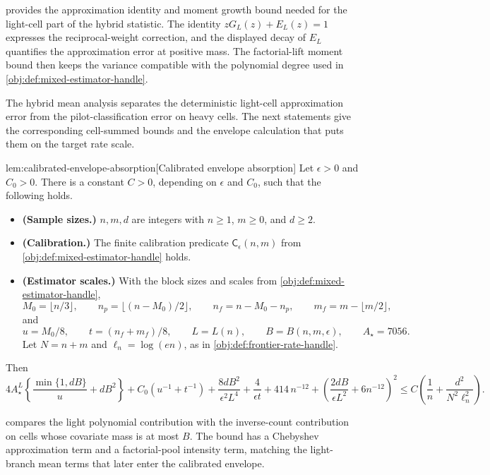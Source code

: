  provides the approximation identity and moment growth bound needed for the light-cell part of the hybrid statistic. The identity \(zG_L(z)+E_L(z)=1\) expresses the reciprocal-weight correction, and the displayed decay of \(E_L\) quantifies the approximation error at positive mass. The factorial-lift moment bound then keeps the variance compatible with the polynomial degree used in \cref{obj:def:mixed-estimator-handle}.

The hybrid mean analysis separates the deterministic light-cell approximation error from the pilot-classification error on heavy cells. The next statements give the corresponding cell-summed bounds and the envelope calculation that puts them on the target rate scale.

\begin{lemmav}{lem:calibrated-envelope-absorption}[Calibrated envelope absorption]
Let \(\epsilon>0\) and \(C_0>0\). There is a constant \(C>0\), depending on \(\epsilon\) and \(C_0\), such that the following holds.

\begin{itemize}
\item \textbf{(Sample sizes.)} \(n,m,d\) are integers with \(n\ge 1\), \(m\ge 0\), and \(d\ge 2\).
\item \textbf{(Calibration.)} The finite calibration predicate \(\mathsf C_\epsilon(n,m)\) from \cref{obj:def:mixed-estimator-handle} holds.
\item \textbf{(Estimator scales.)} With the block sizes and scales from \cref{obj:def:mixed-estimator-handle},
\[
M_0=\lfloor n/3\rfloor,\qquad
n_p=\lfloor (n-M_0)/2\rfloor,\qquad
n_f=n-M_0-n_p,\qquad
m_f=m-\lfloor m/2\rfloor,
\]
and
\[
u=M_0/8,\qquad
t=(n_f+m_f)/8,\qquad
L=L(n),\qquad
B=B(n,m,\epsilon),\qquad
A_\star=7056.
\]
Let \(N=n+m\) and \(\ell_n=\log(en)\), as in \cref{obj:def:frontier-rate-handle}.
\end{itemize}

Then
\[
4A_\star^L
\left\{
\frac{\min\{1,dB\}}{u}+dB^2
\right\}
+C_0\left(u^{-1}+t^{-1}\right)
+\frac{8dB^2}{\epsilon^2L^4}
+\frac{4}{\epsilon t}
+414\,n^{-12}
+\left(
\frac{2dB}{\epsilon L^2}
+6n^{-12}
\right)^2
\le
C\left(
\frac{1}{n}
+\frac{d^2}{N^2\ell_n^2}
\right).
\]
\end{lemmav}

 compares the light polynomial contribution with the inverse-count contribution on cells whose covariate mass is at most \(B\). The bound has a Chebyshev approximation term and a factorial-pool intensity term, matching the light-branch mean terms that later enter the calibrated envelope.

